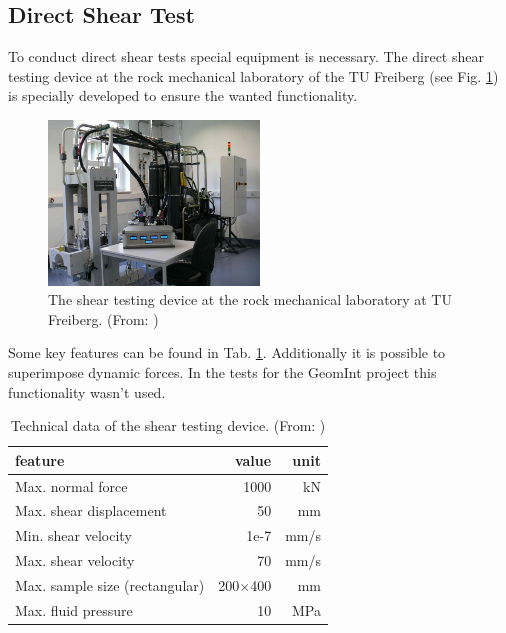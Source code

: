 \subsection{Direct Shear Test}
To conduct direct shear tests special equipment is necessary. The direct shear testing device at the rock mechanical laboratory of the TU Freiberg (see Fig. \ref{fig:ExpCNLShearMachine}) is specially developed to ensure the wanted functionality.\\

\begin{figure}[!ht]
\begin{center}
\includegraphics[width=0.5\textwidth]{./figures/ExpShearMachine.jpg}
\end{center}
\caption{The shear testing device at the rock mechanical laboratory at TU Freiberg. (From: \cite{Konietzky2012})}
\label{fig:ExpCNLShearMachine}
\end{figure}

Some key features can be found in Tab. \ref{table:ExpCNLDeviceTechnicalData}. Additionally it is possible to superimpose dynamic forces. In the tests for the GeomInt project this functionality wasn't used.\\

\begin{table}[!ht]
\begin{center}
\begin{tabular}{l r r}
feature & value & unit\\
\hline
Max. normal force & 1000 & kN\\
Max. shear displacement & 50 &mm\\
Min. shear velocity & 1e-7 & mm/s\\
Max. shear velocity & 70 & mm/s\\
Max. sample size (rectangular) & 200$\times$400 & mm\\
Max. fluid pressure & 10 & MPa\\
\end{tabular}
\caption{Technical data of the shear testing device. (From: \cite{Konietzky2012})}
\label{table:ExpCNLDeviceTechnicalData}
\end{center}
\end{table}

